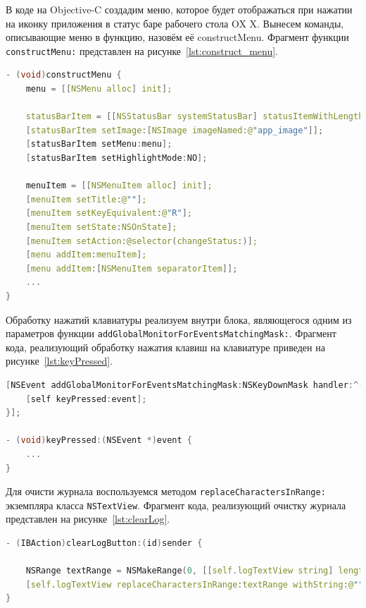 В коде на Objective-C создадим меню, которое будет отображаться при нажатии на
иконку приложения в статус баре рабочего стола OX X. Вынесем команды, описывающие
меню в функцию, назовём её constructMenu. Фрагмент функции \texttt{constructMenu:}
представлен на рисунке~\ref{lst:construct_menu}.
\begin{lstlisting}[basicstyle=\scriptsize\ttfamily,
                   numberstyle=\scriptsize\ttfamily,
                   xleftmargin=7mm,
                   language=C++,caption=Фрагмент функции \texttt{constructMenu:},
                   label=lst:construct_menu]
- (void)constructMenu {
    menu = [[NSMenu alloc] init];

    statusBarItem = [[NSStatusBar systemStatusBar] statusItemWithLength:NSVariableStatusItemLength];
    [statusBarItem setImage:[NSImage imageNamed:@"app_image"]];
    [statusBarItem setMenu:menu];
    [statusBarItem setHighlightMode:NO];

    menuItem = [[NSMenuItem alloc] init];
    [menuItem setTitle:@""];
    [menuItem setKeyEquivalent:@"R"];
    [menuItem setState:NSOnState];
    [menuItem setAction:@selector(changeStatus:)];
    [menu addItem:menuItem];
    [menu addItem:[NSMenuItem separatorItem]];
    ...
}
\end{lstlisting}

Обработку нажатий клавиатуры реализуем внутри блока, являющегося одним из
параметров функции \texttt{addGlobalMonitorForEventsMatchingMask:}. Фрагмент кода,
реализующий обработку нажатия клавиш на клавиатуре приведен на рисунке~\ref{lst:keyPressed}.
\begin{lstlisting}[basicstyle=\scriptsize\ttfamily,
                   numberstyle=\scriptsize\ttfamily,
                   xleftmargin=7mm,
                   language=C++,caption={Фрагмент кода, реализующий обработку \\
                      нажатия клавиш на клавиатуре},
                   label=lst:keyPressed]
[NSEvent addGlobalMonitorForEventsMatchingMask:NSKeyDownMask handler:^(NSEvent *event) {
    [self keyPressed:event];
}];

- (void)keyPressed:(NSEvent *)event {
    ...
}
\end{lstlisting}

Для очисти журнала воспользуемся методом \texttt{replaceCharactersInRange:} экземпляра
класса \texttt{NSTextView}. Фрагмент кода, реализующий очистку журнала представлен
на рисунке~\ref{lst:clearLog}.
\begin{lstlisting}[basicstyle=\scriptsize\ttfamily,
                   numberstyle=\scriptsize\ttfamily,
                   xleftmargin=7mm,
                   language=C++,caption={Фрагмент кода, реализующий очистку журнала},
                   label=lst:clearLog]
- (IBAction)clearLogButton:(id)sender {

    NSRange textRange = NSMakeRange(0, [[self.logTextView string] length]);
    [self.logTextView replaceCharactersInRange:textRange withString:@""];
}
\end{lstlisting}

